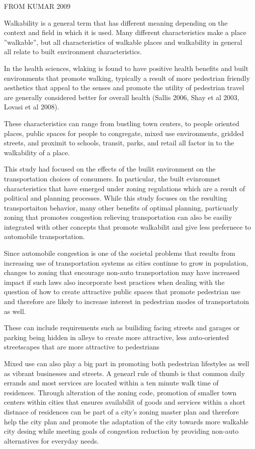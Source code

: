 FROM KUMAR 2009

Walkability is a general term that has different meaning depending on the context and field in which it is used.  Many different characteristics make a place ''walkable'', but all characteristics of walkable places and walkability in general all relate to built environment characteristics.  

In the health sciences, wlaking is found to have positive health benefits and built environments that promote walking, typically a result of more pedestrian friendly aesthetics that appeal to the senses and promote the utility of pedestrian travel are generally considered better for overall health (Sallis 2006, Shay et al 2003, Lovasi et al 2008).  

These characteristics can range from bustling town centers, to people oriented places, public spaces for people to congregate, mixed use environments, gridded streets, and proximit to schools, transit, parks, and retail all factor in to the walkability of a place.

This study had focused on the effects of the builit environment on the transportation choices of consumers.  In particular, the built evinromnet characteristics that have emerged under zoning regulations which are a result of political and planning processes.  While this study focuses on the resulting transportaiton behavior, many other benefits of optimal planning, particuarly zoning that promotes congestion relieving transportation can also be easiliy integrated with other concepts that promote walkabilit and give less prefernece to automobile transportation. 

Since automobile congestion is one of the societal problems that results from increasing use of transportation systems as cities continue to grow in population, changes to zoning that encourage non-auto transportation may have increased impact if such laws also incorporate best practices when dealing with the question of how to create attractive public spaces that promote pedestrian use and therefore are likely to increase interest in pedestrian modes of transportatoin as well.

These can include requirements such as builiding facing streets and garages or parking being hidden in alleys to create more attractive, less auto-oriented streetscapes that are more attractive to pedestrians

Mixed use can also play a big part in promoting both pedestrian lifestyles as well as vibrant businesses and streets.  A genearl rule of thumb is that common daily errands and most services are located within a ten minute walk time of residences.  Through alteration of the zoning code, promotion of smaller town centers within cities that ensures availabilit of goods and services within a short distnace of residences can be part of a city's zoning master plan and therefore help the city plan and promote the adaptation of the city towards more walkable city desing while meeting goals of congestion reduction by providing non-auto alternatives for everyday needs.

